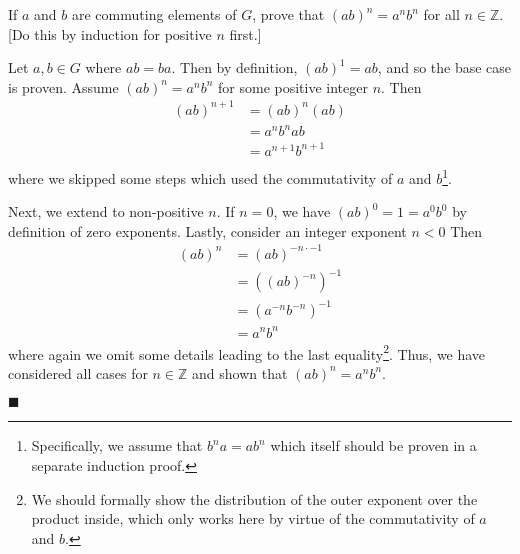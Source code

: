 \documentclass[12pt]{article}
\renewcommand{\qed}{\hfill$\blacksquare$}
\renewenvironment{proof}{\begin{addmargin}[1em]{0em}\begin{newproof}}{\end{newproof}\end{addmargin}\qed}
\newenvironment{problem}[2][Exercise]{\begin{trivlist}
\item[\hskip \labelsep {\bfseries #1}\hskip \labelsep {\bfseries #2.}]}{\end{trivlist}}
\begin{document}
\begin{problem}{1.1.24}
If $a$ and $b$ are commuting elements of $G$, prove that $\left(ab\right)^n = a^n b^n$ for all $n\in \mathbb{Z}$. [Do this by induction for positive $n$ first.]
\end{problem}
\begin{proof}
Let $a,b\in G$ where $ab=ba$. Then by definition, $\left(ab\right)^1 = ab$, and so the base case is proven. Assume $\left(ab\right)^n=a^nb^n$ for some positive integer $n$. Then
\begin{equation*}
    \begin{split}
        \left(ab\right)^{n+1} & = \left(ab\right)^n \left(ab\right) \\
        & = a^nb^n a b \\
        & = a^{n+1}b^{n+1}\\
    \end{split}
\end{equation*}
where we skipped some steps which used the commutativity of $a$ and $b$\footnote{Specifically, we assume that $b^n a = a b^n$ which itself should be proven in a separate induction proof.}.

Next, we extend to non-positive $n$. If $n=0$, we have $\left(ab\right)^0 = 1 = a^0b^0$ by definition of zero exponents. Lastly, consider an integer exponent $n<0$ Then
\begin{equation*}
    \begin{split}
        \left(ab\right)^{n} & = \left(ab\right)^{-n\cdot-1} \\
        & = \left(\left(ab\right)^{-n}\right)^{-1} \\
        & = \left(a^{-n}b^{-n}\right)^{-1} \\
        & = a^n b^n
    \end{split}
\end{equation*}
where again we omit some details leading to the last equality\footnote{We should formally show the distribution of the outer exponent over the product inside, which only works here by virtue of the commutativity of $a$ and $b$.}.
Thus, we have considered all cases for $n\in\mathbb{Z}$ and shown that $\left(ab\right)^n = a^nb^n$.
\end{proof}
\end{document}
